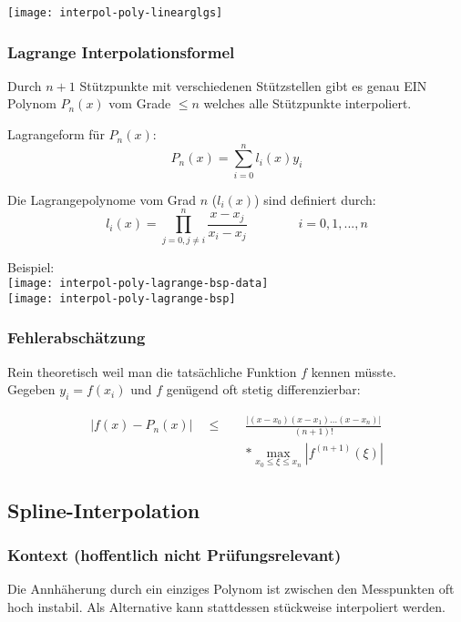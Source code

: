 \texttt{[image: interpol-poly-linearglgs]}


\subsubsection{Lagrange Interpolationsformel}

Durch $n+1$ Stützpunkte mit verschiedenen Stützstellen gibt es genau EIN Polynom
$P_n(x)$ vom Grade $\le n$ welches alle Stützpunkte interpoliert.

Lagrangeform für $P_n(x)$:
$$P_n(x) = \sum_{i=0}^n l_i(x) y_i$$

Die Lagrangepolynome vom Grad $n$ ($l_i(x)$) sind definiert durch:
$$l_i(x) = \prod_{j=0, j \ne i}^n \frac{x - x_j}{x_i - x_j} \qquad \qquad i = 0,1,...,n$$

Beispiel:\\
\texttt{[image: interpol-poly-lagrange-bsp-data]} \\
\texttt{[image: interpol-poly-lagrange-bsp]}


\subsubsection{Fehlerabschätzung}

Rein theoretisch weil man die tatsächliche Funktion $f$ kennen müsste.\\
Gegeben $y_i = f(x_i)$ und $f$ genügend oft stetig differenzierbar:

{
\Large
\begin{align*}
	|f(x) - P_n(x)| \quad \le \quad & \frac{|(x-x_0)(x-x_1)...(x-x_n)|}{(n+1)!}     \\
	                                & * \max_{x_0 \le \xi \le x_n} |f^{(n+1)}(\xi)|
\end{align*}
}



\subsection{Spline-Interpolation}

\subsubsection{Kontext (hoffentlich nicht Prüfungsrelevant)}

Die Annhäherung durch ein einziges Polynom ist zwischen den Messpunkten oft
hoch instabil. Als Alternative kann stattdessen stückweise interpoliert werden.

